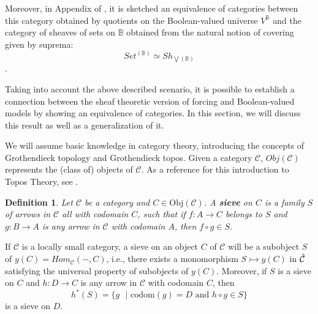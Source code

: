 \documentclass[10pt,longbibliography]{article}
\newtheorem{Def}[Theo]{Definition}
\newcommand{\C}{\mathcal{C}}
\newcommand{\B}{\mathbb{B}}
\newcommand{\hC}{\Hat{\C}}
\begin{document}
Moreover, in Appendix  of \cite{Bell05}, it is sketched an equivalence of categories between this category obtained by quotients on the Boolean-valued universe $V^\B$ and the category of sheaves of sets on $\B$ obtained from the natural notion of covering given by suprema: $$Set^{(\B)} \simeq Sh_{\bigvee(\B)}$$.



    



 


 

Taking into account the above described  scenario, it is possible to establish a connection between the sheaf theoretic version of forcing and Boolean-valued models by showing an equivalence of categories. In this section, we will discuss this result as well as a generalization of it.

We will assume basic knowledge in category theory, introducing the concepts of Grothendieck topology and Grothendieck topos. Given a category $\C$, $Obj(\C)$ represents the (class of) objects of $\C$. As a reference for this introduction to Topos Theory, see \cite{MacMoe94}.


\begin{Def}\label{Sievedef}
	Let $\C$ be a category and $C \in \text{Obj}(\C)$. A \textbf{sieve} on $C$ is a family $S$
	of arrows in $\C$ all with codomain $C$, such that if $f: A \to C$ belongs to $S$ and $g: B \to A$ is any arrow in $\C$ with codomain $A$, then $f \circ g \in S$.
	
\end{Def}

If $\C$ is a locally small category, a sieve on an object $C$ of $\C$ will be a subobject $S$ of $y(C) = Hom_{\C}( - ,C)$, i.e., there exists a monomorphism $S \rightarrowtail y(C)$ in $\hC$ satisfying the universal property of subobjects of $y(C)$. Moreover, if $S$ is a sieve on $C$ and $h: D \to C$ is any arrow in $\C$ with codomain $C$, then 
$$h^{*}(S) = \{g\text{ }|\text{  codom}(g) = D \text{ and } h \circ g \in S\}$$
is a sieve on $D$.
\end{document}
